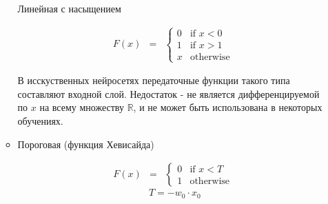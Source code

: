 \begin{itemize}
\begin{itemize}
    					Линейная с насыщением
    						
    					\begin{equation}
                            \begin{matrix}
                            F(x) & =
                            & \left\{
                            \begin{matrix}
                            0 & \mbox{if } x < 0\\
                            1 & \mbox{if } x > 1\\
                            x & \mbox{otherwise }
                            \end{matrix} \right.
                            \end{matrix}
                        \end{equation}
                        
                        В исскуственных нейросетях передаточные функции такого типа составляют входной слой.
    					Недостаток - не является дифференцируемой по $x$ на всему множеству $\mathds{R}$, и не может быть использована 
    					в некоторых обучениях.
    				\item Пороговая (функция Хевисайда)
    				
    					\begin{equation}
                            \begin{matrix}
                            F(x) & =
                            & \left\{
                            \begin{matrix}
                            0 & \mbox{if } x < T\\
                            1 & \mbox{otherwise }
                            \end{matrix} \right.
                            \end{matrix}
                        \end{equation}
    					\[T = - w_0 \cdot x_0\]
    					

\end{itemize}
\end{itemize}
